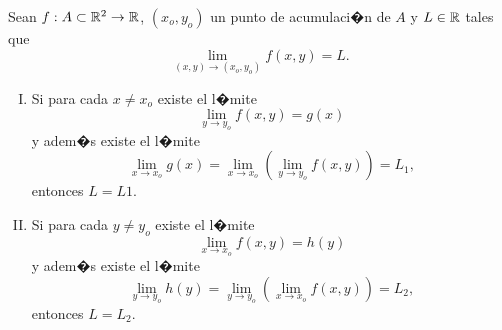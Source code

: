 \documentclass[a4paper]{scrartcl} %
\begin{document}
\begin{propiedad} \label{prop:lim_ite}
  Sean $f: A \subset \mathbb{R}^2 \to \mathbb{R}$, $(x_o,y_o)$ un punto de acumulaci�n de $A$ y $L \in \mathbb{R}$ tales que
  \[
   \lim_{(x,y) \to (x_o,y_o)} f(x,y) = L.
  \]
  \begin{enumerate} [I.]
   \item Si para cada $x \ne x_o$ existe el l�mite
  \[
   \lim_{y \to y_o} f(x,y) = g(x)
  \]
  y adem�s existe el l�mite
  \[
   \lim_{x \to x_o} g(x) = \lim_{x \to x_o} \left( \lim_{y \to y_o} f(x,y) \right) = L_1,
  \]  
  entonces $L = L1$.
  \item Si para cada $y \ne y_o$ existe el l�mite
  \[
   \lim_{x \to x_o} f(x,y) = h(y)
  \]
  y adem�s existe el l�mite
  \[
   \lim_{y \to y_o} h(y) = \lim_{y \to y_o} \left( \lim_{x \to x_o} f(x,y) \right) = L_2, 
  \]
  entonces $L = L_2$.
  \end{enumerate}
\end{propiedad}
\end{document}
